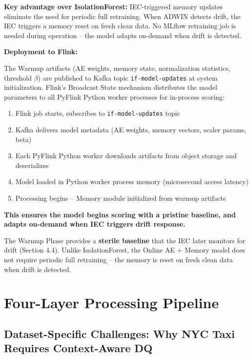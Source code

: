 \textbf{Key advantage over IsolationForest:} IEC-triggered memory updates eliminate the need for periodic full retraining. When ADWIN detects drift, the IEC triggers a memory reset on fresh clean data. No MLflow retraining job is needed during operation -- the model adapts on-demand when drift is detected.

\textbf{Deployment to Flink:}

The Warmup artifacts (AE weights, memory state, normalization statistics, threshold $\beta$) are published to Kafka topic \texttt{if-model-updates} at system initialization. Flink's Broadcast State mechanism distributes the model parameters to all PyFlink Python worker processes for in-process scoring:

\begin{enumerate}
    \item Flink job starts, subscribes to \texttt{if-model-updates} topic
    \item Kafka delivers model metadata (AE weights, memory vectors, scaler params, beta)
    \item Each PyFlink Python worker downloads artifacts from object storage and deserializes
    \item Model loaded in Python worker process memory (microsecond access latency)
    \item Processing begins -- Memory module initialized from warmup artifacts
\end{enumerate}

\textbf{This ensures the model begins scoring with a pristine baseline, and adapts on-demand when IEC triggers drift response.}

The Warmup Phase provides a \textbf{sterile baseline} that the IEC later monitors for drift (Section 4.4). Unlike IsolationForest, the Online AE + Memory model does not require periodic full retraining -- the memory is reset on fresh clean data when drift is detected.

\section{Four-Layer Processing Pipeline}

\subsection{Dataset-Specific Challenges: Why NYC Taxi Requires Context-Aware DQ}

